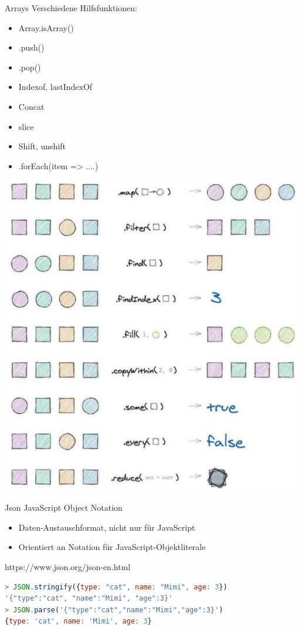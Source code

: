 \begin{code}{Arrays}
    Verschiedene Hilfsfunktionen:

    \begin{minipage}{0.45\linewidth}
        \begin{itemize}
            \item Array.isArray()
            \item .push()
            \item .pop()
            \item Indexof, lastIndexOf
        \end{itemize}
    \end{minipage}
    \begin{minipage}{0.5\linewidth}
        \begin{itemize}
            \item Concat
            \item slice
            \item Shift, unshift
            \item .forEach(item => ....)
        \end{itemize}
    \end{minipage}

    \includegraphics[width=0.8\linewidth]{images/array_cheatsheet.png}
\end{code}
 
\begin{concept}{Json}
    JavaScript Object Notation
    \begin{itemize}
    \item Daten-Austauschformat, nicht nur für JavaScript
    \item Orientiert an Notation für JavaScript-Objektliterale
  \end{itemize}
  https://www.json.org/json-en.html
\begin{lstlisting}[language=JavaScript, style=base, basicstyle=\ttfamily\small]
> JSON.stringify({type: "cat", name: "Mimi", age: 3})
'{"type":"cat", "name":"Mimi", "age":3}'
> JSON.parse('{"type":"cat","name":"Mimi","age":3}')
{type: 'cat', name: 'Mimi', age: 3}
\end{lstlisting}
\end{concept}


